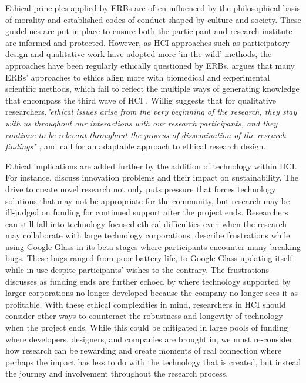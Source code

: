 Ethical principles applied by ERBs are often influenced by the philosophical basis of morality and established codes of conduct shaped by culture and society. These guidelines are put in place to ensure both the participant and research institute are informed and protected. However, as HCI approaches such as participatory design and qualitative work have adopted more 'in the wild' methods, the approaches have been regularly ethically questioned by ERBs. \cite{bell_censorship_2014} argues that many ERBs' approaches to ethics align more with biomedical and experimental scientific methods, which fail to reflect the multiple ways of generating knowledge that encompass the third wave of HCI \citep{bodker_when_2006,lazar_critical_2017}. Willig suggests that for qualitative researchers,\textit{"ethical issues arise from the very beginning of the research, they stay with us throughout our interactions with our research participants, and they continue to be relevant throughout the process of dissemination of the research findings"} \citep{carla_introducing_2013}, and call for an adaptable approach to ethical research design.

Ethical implications are added further by the addition of technology within HCI. For instance, \cite{meurer_designing_2018} discuss innovation problems and their impact on sustainability. The drive to create novel research not only puts pressure that forces technology solutions that may not be appropriate for the community, but research may be ill-judged on funding for continued support after the project ends. Researchers can still fall into technology-focused ethical difficulties even when the research may collaborate with large technology corporations. \cite{vines_our_2017} describe frustrations while using Google Glass in its beta stages where participants encounter many breaking bugs. These bugs ranged from poor battery life, to Google Glass updating itself while in use despite participants' wishes to the contrary. The frustrations \cite{meurer_designing_2018} discusses as funding ends are further echoed by \cite{vines_our_2017}  where technology supported by larger corporations no longer developed because the company no longer sees it as profitable. With these ethical complexities in mind, researchers in HCI should consider other ways to counteract the robustness and longevity of technology when the project ends. While this could be mitigated in large pools of funding where developers, designers, and companies are brought in, we must re-consider how research can be rewarding and create moments of real connection where perhaps the impact has less to do with the technology that is created, but instead the journey and involvement throughout the research process.

